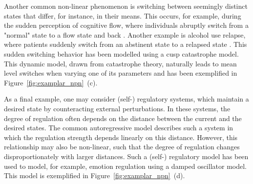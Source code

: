 \documentclass[man, floatsintext]{apa7}
\begin{document}
Another common non-linear phenomenon is switching between seemingly distinct
states that differ, for instance, in their means. This occurs, for example,
during the sudden perception of cognitive flow, where individuals abruptly
switch from a "normal" state to a flow state and back
\parencite{ceja_suddenly_2012}. Another example is alcohol use relapse, where
patients suddenly switch from an abstinent state to a relapsed state
\parencite{witkiewitz_modeling_2007}. This sudden switching behavior has been
modelled using a cusp catastrophe model. This dynamic model, drawn from
catastrophe theory, naturally leads to mean level switches when varying one of
its parameters \parencite{van_der_maas_sudden_2003,chow_cusp_2015} and has been
exemplified in Figure~\ref{fig:examplar_npn}~(c).

As a final example, one may consider (self-) regulatory systems, which maintain
a desired state by counteracting external perturbations. In these systems, the
degree of regulation often depends on the distance
between the current and the desired states. The common autoregressive model
describes such a system in which the regulation strength depends linearly on
this distance. However, this relationship may also be non-linear, such that the
degree of regulation changes disproportionately with larger distances. Such a
(self-) regulatory model has been used to model, for example, emotion
regulation \parencite{chow_emotion_2005} using a damped oscillator model. This
model is exemplified in Figure~\ref{fig:examplar_npn}~(d).
\end{document}
